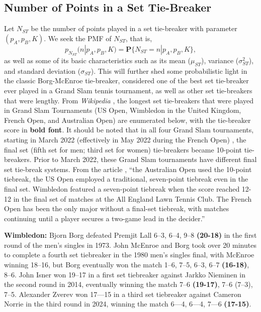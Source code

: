 \documentclass[11pt]{article}
\theoremstyle{plain}
\theoremstyle{definition}
\renewcommand{\Pr}{\mathbf{P}}
\begin{document}
\subsection{Number of Points in a Set Tie-Breaker}

Let $N_{ST}$ be the number of points played in a set tie-breaker with parameter $(p_A,p_B,K)$. We seek the PMF of $N_{ST}$, that is, 
%
$$p_{N_{ST}}(n|p_A,p_B,K) = \Pr\{N_{ST} = n|p_A,p_B,K\},$$
%
as well as some of its basic characteristics such as its mean ($\mu_{ST}$), variance ($\sigma_{ST}^2$), and standard deviation ($\sigma_{ST}$). This will further shed some probabilistic light in the classic Borg-McEnroe tie-breaker, considered one of the best set tie-breaker ever played in a Grand Slam tennis tournament, as well as other set tie-breakers that were lengthy. From {\em Wikipedia} \cite{wiki:longest}, the longest set tie-breakers that were played in Grand Slam Tournaments (US Open, Wimbledon in the United Kingdom, French Open, and Australian Open) are enumerated below, with the tie-breaker score in {\bf bold font}. It should be noted that in all four Grand Slam tournaments, starting in March 2022 (effectively in May 2022 during the French Open) \cite{ESPN2022}, the final set (fifth set for men; third set for women) tie-breakers became 10-point tie-breakers. Prior to March 2022, these Grand Slam tournaments have different final set tie-break systems. From the article \cite{ESPN2022}, ``the Australian Open used the 10-point tiebreak, the US Open employed a traditional, seven-point tiebreak even in the final set. Wimbledon featured a seven-point tiebreak when the score reached 12-12 in the final set of matches at the All England Lawn Tennis Club. The French Open has been the only major without a final-set tiebreak, with matches continuing until a player secures a two-game lead in the decider.''
%

\medskip

\noindent
{\bf Wimbledon:} Bj{o}rn Borg defeated Premjit Lall 6–3, 6–4, 9–8 {\bf (20-18)} in the first round of the men's singles in 1973. John McEnroe and Borg took over 20 minutes to complete a fourth set tiebreaker in the 1980 men's singles final, with McEnroe winning {18–16}, but Borg eventually won the match 1–6, 7–5, 6–3, 6–7 {\bf (16-18)}, 8–6. John Isner won {19–17} in a first set tiebreaker against Jarkko Nieminen in the second round in 2014, eventually winning the match 7–6 {\bf (19-17)}, 7–6 (7–3), 7–5. Alexander Zverev won 17—15 in a third set tiebreaker against Cameron Norrie in the third round in 2024, winning the match 6—4, 6—4, 7—6 {\bf (17-15)}.
\end{document}
